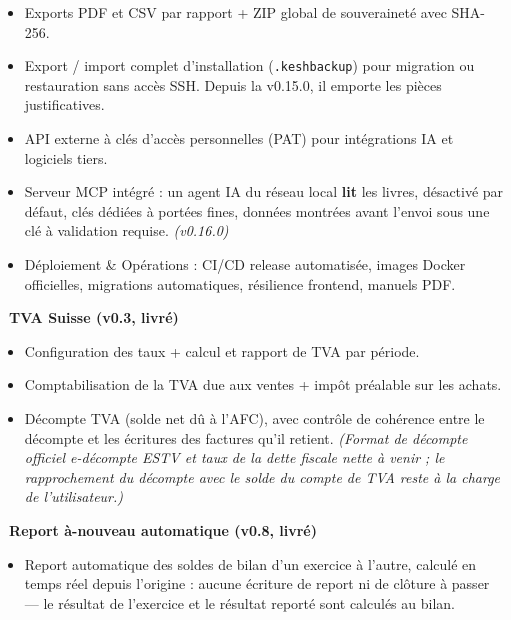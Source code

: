 \documentclass[a4paper,11pt,oneside]{article}
\begin{document}
\begin{itemize}
    \item Exports PDF et CSV par rapport + ZIP global de souveraineté avec SHA-256.
    \item Export / import complet d'installation (\texttt{.keshbackup}) pour migration ou restauration sans accès SSH. Depuis la v0.15.0, il emporte les pièces justificatives.
    \item API externe à clés d'accès personnelles (PAT) pour intégrations IA et logiciels tiers.
    \item Serveur MCP intégré : un agent IA du réseau local \textbf{lit} les livres, désactivé par défaut, clés dédiées à portées fines, données montrées avant l'envoi sous une clé à validation requise. \emph{(v0.16.0)}
    \item Déploiement \& Opérations : CI/CD release automatisée, images Docker officielles, migrations automatiques, résilience frontend, manuels PDF.
\end{itemize}

\vspace{0.4cm}

\textbf{\color{keshSuccess}\faCheckCircle\ TVA Suisse (v0.3, livré)}

\begin{itemize}
    \item Configuration des taux + calcul et rapport de TVA par période.
    \item Comptabilisation de la TVA due aux ventes + impôt préalable sur les achats.
    \item Décompte TVA (solde net dû à l'AFC), avec contrôle de cohérence entre le décompte et les écritures des factures qu'il retient. \emph{(Format de décompte officiel e-décompte ESTV et taux de la dette fiscale nette à venir ; le rapprochement du décompte avec le solde du compte de TVA reste à la charge de l'utilisateur.)}
\end{itemize}

\vspace{0.4cm}

\textbf{\color{keshSuccess}\faCheckCircle\ Report à-nouveau automatique (v0.8, livré)}

\begin{itemize}
    \item Report automatique des soldes de bilan d'un exercice à l'autre, calculé en temps réel depuis l'origine : aucune écriture de report ni de clôture à passer --- le résultat de l'exercice et le résultat reporté sont calculés au bilan.
\end{itemize}
\end{document}

